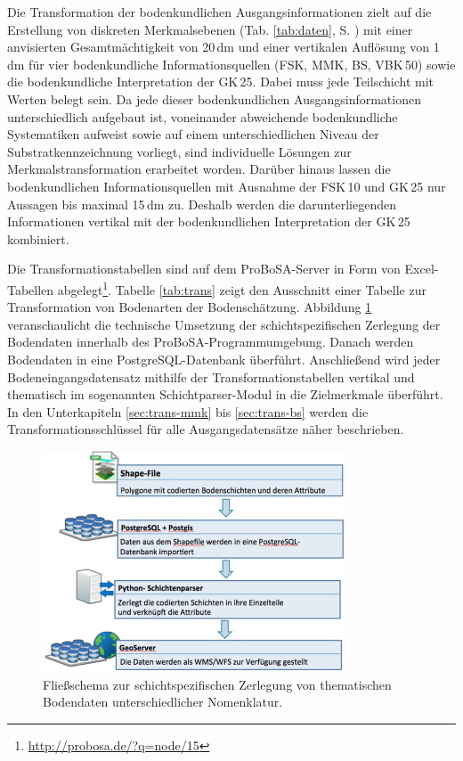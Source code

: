Die Transformation der bodenkundlichen Ausgangsinformationen zielt auf die Erstellung von diskreten Merkmalsebenen (Tab. \ref{tab:daten}, S. \pageref{tab:daten}) mit einer anvisierten Gesamtmächtigkeit von 20\,dm und einer vertikalen Auflösung von 1\,dm für vier bodenkundliche Informationsquellen (FSK, MMK, BS, VBK\,50) sowie die bodenkundliche Interpretation der GK\,25. Dabei muss jede Teilschicht mit Werten belegt sein. Da jede dieser bodenkundlichen Ausgangsinformationen unterschiedlich aufgebaut ist, voneinander abweichende bodenkundliche Systematiken aufweist sowie auf einem unterschiedlichen Niveau der Substratkennzeichnung vorliegt, sind individuelle Lösungen zur Merkmalstransformation erarbeitet worden. Darüber hinaus lassen die bodenkundlichen Informationsquellen mit Ausnahme der FSK\,10 und GK\,25 nur Aussagen bis maximal 15\,dm zu. Deshalb werden die darunterliegenden Informationen vertikal mit der bodenkundlichen Interpretation der GK\,25 kombiniert.\

Die Transformationstabellen sind auf dem ProBoSA-Server in Form von Excel-Tabellen abgelegt\footnote{\url{http://probosa.de/?q=node/15}}. Tabelle \ref{tab:trans} zeigt den Ausschnitt einer Tabelle zur Transformation von Bodenarten der Bodenschätzung. Abbildung  \ref{fig:parser} veranschaulicht die technische Umsetzung der  schichtspezifischen Zerlegung der Bodendaten innerhalb des ProBoSA-Programmumgebung. Danach werden Bodendaten in eine PostgreSQL-Datenbank überführt. Anschließend wird jeder Bodeneingangsdatensatz  mithilfe der Transformationstabellen vertikal und thematisch im sogenannten Schichtparser-Modul in die Zielmerkmale überführt. In den Unterkapiteln  \ref{sec:trans-mmk} bis \ref{sec:trans-bs} werden die Transformationsschlüssel für alle Ausgangsdatensätze näher beschrieben.

\begin{figure}[t]
\centering\includegraphics[width=0.8\textwidth]{figures/parser}
\caption{Fließschema zur schichtspezifischen Zerlegung von thematischen Bodendaten unterschiedlicher Nomenklatur.}\label{fig:parser}
\end{figure}

